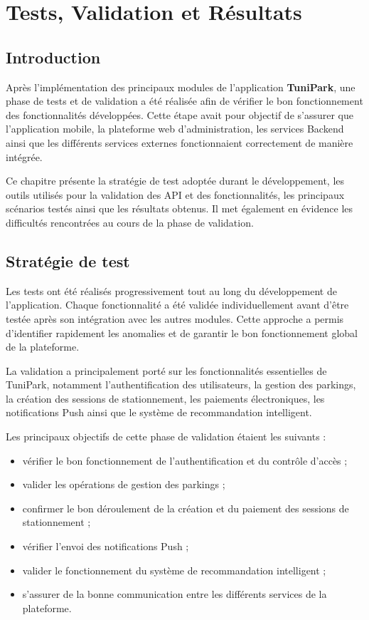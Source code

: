 \chapter{Tests, Validation et Résultats}
\label{chap:testing_validation_results}
\section{Introduction}

\par Après l'implémentation des principaux modules de l'application \textbf{TuniPark}, une phase de tests et de validation a été réalisée afin de vérifier le bon fonctionnement des fonctionnalités développées. Cette étape avait pour objectif de s'assurer que l'application mobile, la plateforme web d'administration, les services Backend ainsi que les différents services externes fonctionnaient correctement de manière intégrée.

\par Ce chapitre présente la stratégie de test adoptée durant le développement, les outils utilisés pour la validation des API et des fonctionnalités, les principaux scénarios testés ainsi que les résultats obtenus. Il met également en évidence les difficultés rencontrées au cours de la phase de validation.

\section{Stratégie de test}

\par Les tests ont été réalisés progressivement tout au long du développement de l'application. Chaque fonctionnalité a été validée individuellement avant d'être testée après son intégration avec les autres modules. Cette approche a permis d'identifier rapidement les anomalies et de garantir le bon fonctionnement global de la plateforme.

\par La validation a principalement porté sur les fonctionnalités essentielles de TuniPark, notamment l'authentification des utilisateurs, la gestion des parkings, la création des sessions de stationnement, les paiements électroniques, les notifications Push ainsi que le système de recommandation intelligent.

\par Les principaux objectifs de cette phase de validation étaient les suivants :

\begin{itemize}
\item vérifier le bon fonctionnement de l'authentification et du contrôle d'accès ;
\item valider les opérations de gestion des parkings ;
\item confirmer le bon déroulement de la création et du paiement des sessions de stationnement ;
\item vérifier l'envoi des notifications Push ;
\item valider le fonctionnement du système de recommandation intelligent ;
\item s'assurer de la bonne communication entre les différents services de la plateforme.
\end{itemize}
